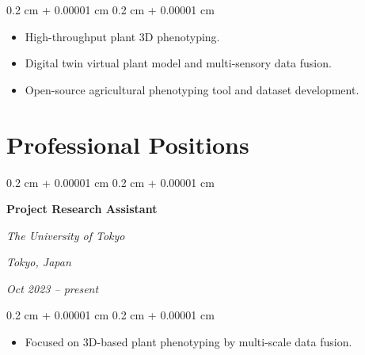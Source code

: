 \documentclass[10pt, letterpaper]{article}
\newenvironment{highlights}{
    \begin{itemize}[
        topsep=0.10 cm,
        parsep=0.10 cm,
        partopsep=0pt,
        itemsep=0pt,
        leftmargin=0.4 cm + 10pt
    ]
}{
    \end{itemize}
} %
\newenvironment{highlightsforbulletentries}{
    \begin{itemize}[
        topsep=0.10 cm,
        parsep=0.10 cm,
        partopsep=0pt,
        itemsep=0pt,
        leftmargin=10pt
    ]
}{
    \end{itemize}
} %
\newenvironment{onecolentry}{
    \begin{adjustwidth}{
        0.2 cm + 0.00001 cm
    }{
        0.2 cm + 0.00001 cm
    }
}{
    \end{adjustwidth}
} %
\newenvironment{twocolentry}[2][]{
    \onecolentry
    \def\secondColumn{#2}
    \setcolumnwidth{\fill, 4.5 cm}
    \begin{paracol}{2}
}{
    \switchcolumn \raggedleft \secondColumn
    \end{paracol}
    \endonecolentry
} %
\begin{document}
        \begin{onecolentry}
            \begin{highlightsforbulletentries}

            \item High-throughput plant 3D phenotyping.

            \item Digital twin virtual plant model and multi-sensory data fusion.

            \item Open-source agricultural phenotyping tool and dataset development.

            \end{highlightsforbulletentries}
        \end{onecolentry}

    \section{Professional Positions}
        
        \begin{twocolentry}{
            \textit{Tokyo, Japan}    
            
            \textit{Oct 2023 – present}}
            \textbf{Project Research Assistant}
            
            \textit{The University of Tokyo}
        \end{twocolentry}

        \vspace{0.10 cm}
        \begin{onecolentry}
            \begin{highlights}
                \item Focused on 3D-based plant phenotyping by multi-scale data fusion.
            \end{highlights}
        \end{onecolentry}



            
            
\end{document}
